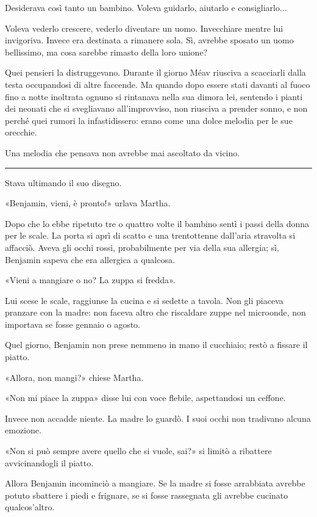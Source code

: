 \documentclass[a4paper,10pt]{memoir}
\begin{document}
Desiderava così tanto un bambino. Voleva guidarlo, aiutarlo e consigliarlo...

Voleva vederlo crescere, vederlo diventare un uomo. Invecchiare mentre lui invigoriva. Invece era destinata a rimanere
sola. Sì, avrebbe sposato un uomo bellissimo, ma cosa sarebbe rimasto della loro unione?

Quei pensieri la distruggevano. Durante il giorno Méav riusciva a scacciarli dalla testa occupandosi di altre faccende.
Ma quando dopo essere stati davanti al fuoco fino a notte inoltrata ognuno si rintanava nella sua dimora lei, sentendo i
pianti dei neonati che si svegliavano all'improvviso, non riusciva a prender sonno, e non perché quei rumori la
infastidissero: erano come una dolce melodia per le sue orecchie.

Una melodia che pensava non avrebbe mai ascoltato da vicino.

\plainbreak{1}

Stava ultimando il suo disegno.

«Benjamin, vieni, è pronto!» urlava Martha.

Dopo che lo ebbe ripetuto tre o quattro volte il bambino sentì i passi della donna per le scale. La porta si aprì di
scatto e una trentottenne dall'aria stravolta si affacciò. Aveva gli occhi rossi, probabilmente per via della sua
allergia; sì, Benjamin sapeva che era allergica a qualcosa.

«Vieni a mangiare o no? La zuppa si fredda».

Lui scese le scale, raggiunse la cucina e si sedette a tavola. Non gli piaceva pranzare con la madre: non faceva altro
che riscaldare zuppe nel microonde, non importava se fosse gennaio o agosto.

Quel giorno, Benjamin non prese nemmeno in mano il cucchiaio; restò a fissare il piatto.

«Allora, non mangi?» chiese Martha.

«Non mi piace la zuppa» disse lui con voce flebile, aspettandosi un ceffone.

Invece non accadde niente. La madre lo guardò. I suoi occhi non tradivano alcuna emozione.

«Non si può sempre avere quello che si vuole, sai?» si limitò a ribattere avvicinandogli il piatto.

Allora Benjamin incominciò a mangiare. Se la madre si fosse arrabbiata avrebbe potuto sbattere i piedi e frignare, se si
fosse rassegnata gli avrebbe cucinato qualcos'altro.
\end{document}
